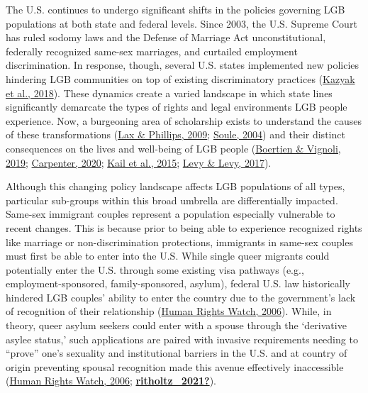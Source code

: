 \documentclass[
  12pt,
]{article}
\begin{document}
The U.S. continues to undergo significant shifts in the policies governing LGB populations at both state and federal levels. Since 2003, the U.S. Supreme Court has ruled sodomy laws and the Defense of Marriage Act unconstitutional, federally recognized same-sex marriages, and curtailed employment discrimination. In response, though, several U.S. states implemented new policies hindering LGB communities on top of existing discriminatory practices (\protect\hyperlink{ref-kazyak_2018}{Kazyak et al., 2018}). These dynamics create a varied landscape in which state lines significantly demarcate the types of rights and legal environments LGB people experience. Now, a burgeoning area of scholarship exists to understand the causes of these transformations (\protect\hyperlink{ref-lax_2009}{Lax \& Phillips, 2009}; \protect\hyperlink{ref-soule_2004}{Soule, 2004}) and their distinct consequences on the lives and well-being of LGB people (\protect\hyperlink{ref-boertien_2019}{Boertien \& Vignoli, 2019}; \protect\hyperlink{ref-carpenter_2020}{Carpenter, 2020}; \protect\hyperlink{ref-kail_2015}{Kail et al., 2015}; \protect\hyperlink{ref-levy_2017}{Levy \& Levy, 2017}).

Although this changing policy landscape affects LGB populations of all types, particular sub-groups within this broad umbrella are differentially impacted. Same-sex immigrant couples represent a population especially vulnerable to recent changes. This is because prior to being able to experience recognized rights like marriage or non-discrimination protections, immigrants in same-sex couples must first be able to enter into the U.S. While single queer migrants could potentially enter the U.S. through some existing visa pathways (e.g., employment-sponsored, family-sponsored, asylum), federal U.S. law historically hindered LGB couples' ability to enter the country due to the government's lack of recognition of their relationship (\protect\hyperlink{ref-humanrightswatch_2006}{Human Rights Watch, 2006}). While, in theory, queer asylum seekers could enter with a spouse through the `derivative asylee status,' such applications are paired with invasive requirements needing to ``prove'' one's sexuality and institutional barriers in the U.S. and at country of origin preventing spousal recognition made this avenue effectively inaccessible (\protect\hyperlink{ref-humanrightswatch_2006}{Human Rights Watch, 2006}; \protect\hyperlink{ref-ritholtz_2021}{\textbf{ritholtz\_2021?}}).
\end{document}

